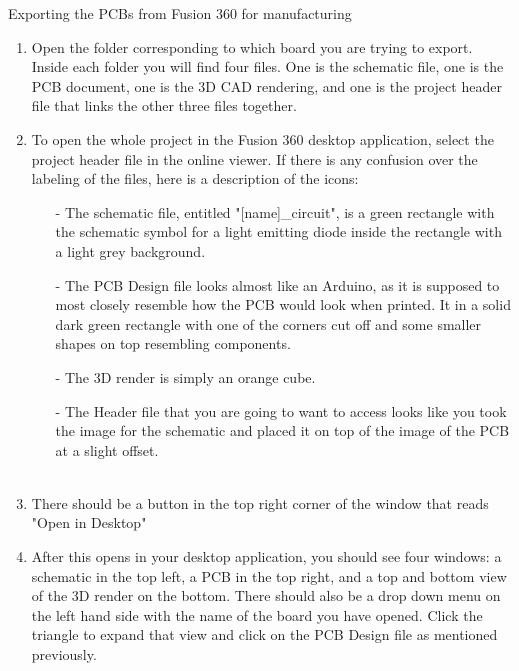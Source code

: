 \begin{subsubsec}{Exporting the PCBs from Fusion 360 for manufacturing}
\begin{enumerate}
    \item Open the folder corresponding to which board you are trying to export. Inside each folder you will find four files. One is the schematic file, one is the PCB document, one is the 3D CAD rendering, and one is the project header file that links the other three files together.
    \item To open the whole project in the Fusion 360 desktop application, select the project header file in the online viewer. If there is any confusion over the labeling of the files, here is a description of the icons:
    \begin{itemize}
        \item[-] The schematic file, entitled "[name]\_circuit", is a green rectangle with the schematic symbol for a light emitting diode inside the rectangle with a light grey background.
        \item[-]The PCB Design file looks almost like an Arduino, as it is supposed to most closely resemble how the PCB would look when printed. It in a solid dark green rectangle with one of the corners cut off and some smaller shapes on top resembling components. 
        \item[-] The 3D render is simply an orange cube.
        \item[-] The Header file that you are going to want to access looks like you took the image for the schematic and placed it on top of the image of the PCB at a slight offset. 
        \\\\
    \end{itemize}
    \item There should be a button in the top right corner of the window that reads "Open in Desktop"
    \item After this opens in your desktop application, you should see four windows: a schematic in the top left, a PCB in the top right, and a top and bottom view of the 3D render on the bottom. There should also be a drop down menu on the left hand side with the name of the board you have opened. Click the triangle to expand that view and click on the PCB Design file as mentioned previously. 

\end{enumerate}
\end{subsubsec}
